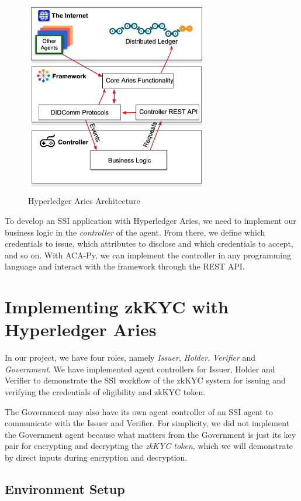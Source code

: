 \documentclass[
]{report}
\begin{document}
\begin{figure}
\centering
\includegraphics[width=8cm]{aca-py.png}
\caption{Hyperledger Aries Architecture}
\end{figure}

To develop an SSI application with Hyperledger Aries, we need to
implement our business logic in the \emph{controller} of the agent.  
From there, we define which credentials to issue, which attributes to
disclose and which credentials to accept, and so on. With ACA-Py, we
can implement the controller in any programming language and interact
with the framework through the REST API.

\section{Implementing zkKYC with Hyperledger Aries}

In our project, we have four roles, namely \emph{Issuer}, \emph{Holder},
\emph{Verifier} and \emph{Government}. We have implemented agent controllers
for Issuer, Holder and Verifier to demonstrate the SSI workflow of the
zkKYC system for issuing and verifying the credentials of eligibility and
zkKYC token.

The Government may also have its own agent controller of
an SSI agent to communicate with the Issuer and Verifier. For simplicity,
we did not implement the Government agent because what matters from the
Government is just its key pair for encrypting and decrypting the
\emph{zkKYC token}, which we will demonstrate by direct inputs during
encryption and decryption.

\subsection{Environment Setup}
\end{document}
